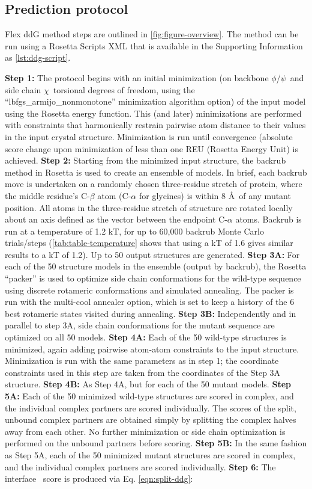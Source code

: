 \subsection{Prediction protocol}

Flex ddG method steps are outlined in \cref{fig:figure-overview}. The method can be run using a Rosetta Scripts XML that is available in the Supporting Information as \cref{lst:ddg-script}.

\textbf{Step 1:} The protocol begins with an initial minimization (on backbone $\phi$/$\psi$\ and side chain $\chi$\ torsional degrees of freedom, using the ``lbfgs\_armijo\_nonmonotone'' minimization algorithm option) of the input model using the Rosetta energy function. This (and later) minimizations are performed with constraints that harmonically restrain pairwise atom distance to their values in the input crystal structure. Minimization is run until convergence (absolute score change upon minimization of less than one REU (Rosetta Energy Unit) is achieved.
\textbf{Step 2:} Starting from the minimized input structure, the backrub method in Rosetta is used to create an ensemble of models. In brief, each backrub move is undertaken on a randomly chosen three-residue stretch of protein, where the middle residue's C-$\beta$ atom (C-$\alpha$ for glycines) is within 8 \AA\ of any mutant position. All atoms in the three-residue stretch of structure are rotated locally about an axis defined as the vector between the endpoint C-$\alpha$ atoms. Backrub is run at a temperature of 1.2 kT, for up to 60,000 backrub Monte Carlo trials/steps (\cref{tab:table-temperature} shows that using a kT of 1.6 gives similar results to a kT of 1.2). Up to 50 output structures are generated.
\textbf{Step 3A:} For each of the 50 structure models in the ensemble (output by backrub), the Rosetta ``packer'' is used to optimize side chain conformations for the wild-type sequence using discrete rotameric conformations \cite{shapovalov_smoothed_2011} and simulated annealing. The packer is run with the multi-cool annealer option\cite{leaver-fay_generic_2011}, which is set to keep a history of the 6 best rotameric states visited during annealing.
\textbf{Step 3B:} Independently and in parallel to step 3A, side chain conformations for the mutant sequence are optimized on all 50 models.
\textbf{Step 4A:} Each of the 50 wild-type structures is minimized, again adding pairwise atom-atom constraints to the input structure. Minimization is run with the same parameters as in step 1; the coordinate constraints used in this step are taken from the coordinates of the Step 3A structure.
\textbf{Step 4B:} As Step 4A, but for each of the 50 mutant models.
\textbf{Step 5A:} Each of the 50 minimized wild-type structures are scored in complex, and the individual complex partners are scored individually. The scores of the split, unbound complex partners are obtained simply by splitting the complex halves away from each other. No further minimization or side chain optimization is performed on the unbound partners before scoring.
\textbf{Step 5B:} In the same fashion as Step 5A, each of the 50 minimized mutant structures are scored in complex, and the individual complex partners are scored individually.
\textbf{Step 6:} The interface \ddg\ score is produced via Eq. \ref{eqn:split-ddg}:

